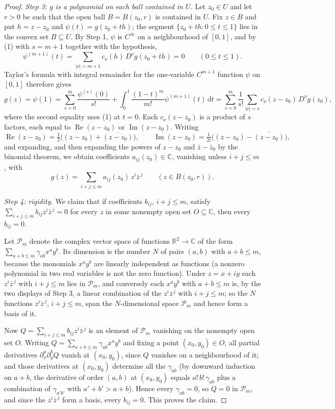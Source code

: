 \begin{proof}
\emph{Step 3: $g$ is a polynomial on each ball contained in $U$.}  Let $z_0\in U$
and let $r>0$ be such that the open ball $B=B(z_0,r)$ is contained in $U$.  Fix
$z\in B$ and put $h=z-z_0$ and $\psi(t)=g(z_0+th)$; the segment
$\{z_0+th:0\le t\le1\}$ lies in the convex set $B\subseteq U$.  By Step 1,
$\psi$ is $C^\infty$ on a neighbourhood of $[0,1]$, and by (1) with $s=m+1$
together with the hypothesis,
\[
  \psi^{(m+1)}(t)=\sum_{|\nu|=m+1}c_\nu(h)\,D^\nu g(z_0+th)=0
  \qquad(0\le t\le1).
\]
Taylor's formula with integral remainder for the one-variable $C^{m+1}$
function $\psi$ on $[0,1]$ therefore gives
\[
  g(z)=\psi(1)=\sum_{s=0}^{m}\frac{\psi^{(s)}(0)}{s!}
    +\int_0^1\frac{(1-t)^m}{m!}\psi^{(m+1)}(t)\,\mathrm{d}t
  =\sum_{s=0}^{m}\frac{1}{s!}\sum_{|\nu|=s}c_\nu(z-z_0)\,D^\nu g(z_0),
\]
where the second equality uses (1) at $t=0$.  Each $c_\nu(z-z_0)$ is a product
of $s$ factors, each equal to $\operatorname{Re}(z-z_0)$ or
$\operatorname{Im}(z-z_0)$.  Writing
\[
  \operatorname{Re}(z-z_0)=\tfrac12\bigl((z-z_0)+\overline{(z-z_0)}\bigr),
  \qquad
  \operatorname{Im}(z-z_0)=\tfrac1{2i}\bigl((z-z_0)-\overline{(z-z_0)}\bigr),
\]
and expanding, and then expanding the powers of $z-z_0$ and
$\bar z-\bar z_0$ by the binomial theorem, we obtain coefficients
$a_{ij}(z_0)\in\mathbb{C}$, vanishing unless $i+j\le m$, with
\begin{equation}\tag{2}
  g(z)=\sum_{i+j\le m}a_{ij}(z_0)\,z^i\bar z^{\,j}\qquad(z\in B(z_0,r)).
\end{equation}

\emph{Step 4: rigidity.}  We claim that if coefficients $b_{ij}$, $i+j\le m$,
satisfy $\sum_{i+j\le m}b_{ij}z^i\bar z^{\,j}=0$ for every $z$ in some nonempty
open set $O\subseteq\mathbb{C}$, then every $b_{ij}=0$.

Let $\mathcal{P}_m$ denote the complex vector space of functions
$\mathbb{R}^2\to\mathbb{C}$ of the form $\sum_{a+b\le m}\gamma_{ab}x^ay^b$.  Its
dimension is the number $N$ of pairs $(a,b)$ with $a+b\le m$, because the
monomials $x^ay^b$ are linearly independent as functions (a nonzero polynomial
in two real variables is not the zero function).  Under $z=x+iy$ each
$z^i\bar z^{\,j}$ with $i+j\le m$ lies in $\mathcal{P}_m$, and conversely each
$x^ay^b$ with $a+b\le m$ is, by the two displays of Step 3, a linear
combination of the $z^i\bar z^{\,j}$ with $i+j\le m$; so the $N$ functions
$z^i\bar z^{\,j}$, $i+j\le m$, span the $N$-dimensional space $\mathcal{P}_m$
and hence form a basis of it.

Now $Q=\sum_{i+j\le m}b_{ij}z^i\bar z^{\,j}$ is an element of $\mathcal{P}_m$
vanishing on the nonempty open set $O$.  Writing $Q=\sum_{a+b\le m}
\gamma_{ab}x^ay^b$ and fixing a point $(x_0,y_0)\in O$, all partial derivatives
$\partial_x^a\partial_y^bQ$ vanish at $(x_0,y_0)$, since $Q$ vanishes on a
neighbourhood of it; and those derivatives at $(x_0,y_0)$ determine all the
$\gamma_{ab}$ (by downward induction on $a+b$, the derivative of order $(a,b)$
at $(x_0,y_0)$ equals $a!\,b!\,\gamma_{ab}$ plus a combination of
$\gamma_{a'b'}$ with $a'+b'>a+b$).  Hence every $\gamma_{ab}=0$, so $Q=0$ in
$\mathcal{P}_m$, and since the $z^i\bar z^{\,j}$ form a basis, every
$b_{ij}=0$.  This proves the claim.


\end{proof}
